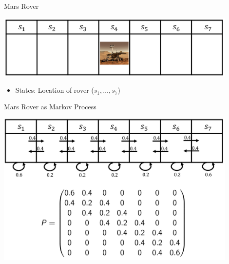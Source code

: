 \documentclass[aspectratio=169]{../latex_main/tntbeamer}  %
\begin{document}
\begin{frame}[c]{Mars Rover}
	
	\centering
	\includegraphics[width=0.9\textwidth]{images/mars_rover.png}
	
	\bigskip
	\begin{itemize}
		\item States: Location of rover ($s_1, \ldots, s_7$)
	\end{itemize}
	
\end{frame}
\begin{frame}[c]{Mars Rover as Markov Process}
	
	\centering
	\includegraphics[width=0.9\textwidth]{images/mars_rover_markov_process.png}
	
	
\end{frame}
\end{document}
